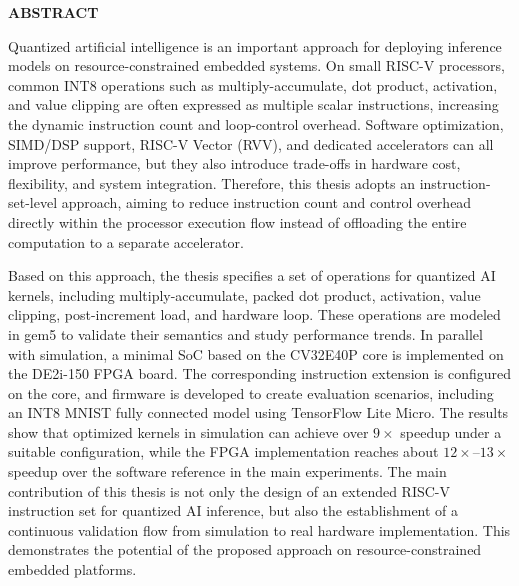 \documentclass[../DoAn.tex]{subfiles}
\begin{document}
\begin{center}
    \Large{\textbf{ABSTRACT}}\\
\end{center}
\vspace{1cm}

Quantized artificial intelligence is an important approach for deploying inference models on resource-constrained embedded systems. On small RISC-V processors, common INT8 operations such as multiply-accumulate, dot product, activation, and value clipping are often expressed as multiple scalar instructions, increasing the dynamic instruction count and loop-control overhead. Software optimization, SIMD/DSP support, RISC-V Vector (RVV), and dedicated accelerators can all improve performance, but they also introduce trade-offs in hardware cost, flexibility, and system integration. Therefore, this thesis adopts an instruction-set-level approach, aiming to reduce instruction count and control overhead directly within the processor execution flow instead of offloading the entire computation to a separate accelerator.

Based on this approach, the thesis specifies a set of operations for quantized AI kernels, including multiply-accumulate, packed dot product, activation, value clipping, post-increment load, and hardware loop. These operations are modeled in gem5 to validate their semantics and study performance trends. In parallel with simulation, a minimal SoC based on the CV32E40P core is implemented on the DE2i-150 FPGA board. The corresponding instruction extension is configured on the core, and firmware is developed to create evaluation scenarios, including an INT8 MNIST fully connected model using TensorFlow Lite Micro. The results show that optimized kernels in simulation can achieve over \(9\times\) speedup under a suitable configuration, while the FPGA implementation reaches about \(12\times\)--\(13\times\) speedup over the software reference in the main experiments. The main contribution of this thesis is not only the design of an extended RISC-V instruction set for quantized AI inference, but also the establishment of a continuous validation flow from simulation to real hardware implementation. This demonstrates the potential of the proposed approach on resource-constrained embedded platforms.
\end{document}
